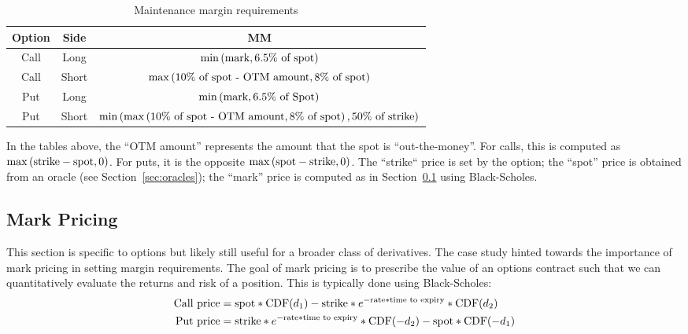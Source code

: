 \documentclass{article}
\begin{document}
\begin{table}[h!]
    \centering
    \begin{tabular}{c|c|c}
         \textbf{Option} & \textbf{Side} & \textbf{MM} \\
         \hline
         Call & Long & $\min\left(\textup{mark}, \textup{6.5\% of spot}\right)$ \\ 
         Call & Short & $\max\left(\textup{10\% of spot - OTM amount}, \textup{8\% of spot}\right)$  \\
         Put & Long & $\min\left(\textup{mark}, \textup{6.5\% of Spot}\right)$ \\ 
         Put & Short & $\min\left( \max\left( \textup{10\% of spot - OTM amount}, \textup{8\% of spot} \right), \textup{50\% of strike} \right)$ \\ 
    \end{tabular}
    \caption{Maintenance margin requirements}
    \label{tab:my_label}
\end{table}

\noindent In the tables above, the ``OTM amount'' represents the amount that the spot is ``out-the-money''. For calls, this is computed as $\max\left(\textup{strike} - \textup{spot}, 0 \right)$. For puts, it is the opposite $\max\left(\textup{spot} - \textup{strike}, 0 \right)$. The ``strike`` price is set by the option; the ``spot'' price is obtained from an oracle (see Section~\ref{sec:oracles}); the ``mark'' price is computed as in Section~\ref{sec:mark} using Black-Scholes.

\subsection{Mark Pricing}
\label{sec:mark}

This section is specific to options but likely still useful for a broader class of derivatives. The case study hinted towards the importance of mark pricing in setting margin requirements. The goal of mark pricing is to prescribe the value of an options contract such that we can quantitatively evaluate the returns and risk of a position. This is typically done using Black-Scholes:
\begin{align}
\textup{Call price} &= \textup{spot} * \textup{CDF}(d_1) - \textup{strike} * e^{-\textup{rate} * \textup{time to expiry}} * \textup{CDF}(d_2) \\
\textup{Put price} &= \textup{strike} * e^{-\textup{rate} * \textup{time to expiry}} * \textup{CDF}(-d_2) - \textup{spot} * \textup{CDF}(-d_1)
\end{align}
\end{document}
